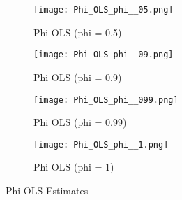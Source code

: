\documentclass[12pt]{article}
\begin{document}
\begin{figure}[H]
    \centering
    \begin{subfigure}[b]{0.45\textwidth}
        \texttt{[image: Phi\_OLS\_phi\_\_05.png]}
        \caption{Phi OLS (phi = 0.5)}
        \label{fig:phi_ols_0_5}
    \end{subfigure}
    \hfill
    \begin{subfigure}[b]{0.45\textwidth}
        \texttt{[image: Phi\_OLS\_phi\_\_09.png]}
        \caption{Phi OLS (phi = 0.9)}
        \label{fig:phi_ols_0_9}
    \end{subfigure}
    \vfill
    \begin{subfigure}[b]{0.45\textwidth}
        \texttt{[image: Phi\_OLS\_phi\_\_099.png]}
        \caption{Phi OLS (phi = 0.99)}
        \label{fig:phi_ols_0_99}
    \end{subfigure}
    \hfill
    \begin{subfigure}[b]{0.45\textwidth}
        \texttt{[image: Phi\_OLS\_phi\_\_1.png]}
        \caption{Phi OLS (phi = 1)}
        \label{fig:phi_ols_1}
    \end{subfigure}
    \caption{Phi OLS Estimates}
    \label{fig:phi_ols}
\end{figure}
\end{document}
